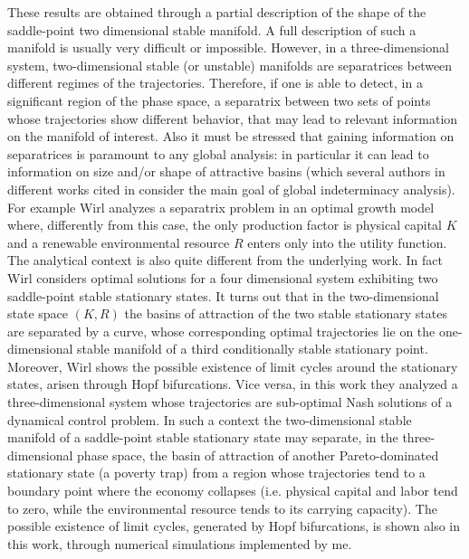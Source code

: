 These results are obtained through a partial description of the shape of the saddle-point two dimensional stable manifold. A full description of such a manifold is usually very difficult or impossible. However, in a three-dimensional system, two-dimensional stable (or unstable) manifolds are separatrices between different regimes of the trajectories. Therefore, if one is able to detect, in a significant region of the phase space, a separatrix between two sets of points whose trajectories show different behavior, that may lead to relevant information on the manifold of interest. Also it must be stressed that gaining information on separatrices is paramount to any global analysis: in particular it can lead to information on size and/or shape of attractive basins (which several authors in different works cited in \cite{antoci_poverty_2011} consider the main goal of global indeterminacy analysis).\\ 
For example Wirl \cite{wirl_sustainable_2004} analyzes a separatrix problem in an optimal growth model where, differently from this case, the only production factor is physical capital $K$ and a renewable environmental resource $R$ enters only into the utility function. The analytical context is also quite different from the underlying work. In fact Wirl considers optimal solutions for a four dimensional system exhibiting two saddle-point stable stationary states. It turns out that in the two-dimensional state space $(K,R)$ the basins of attraction of the two stable stationary states are separated by a curve, whose corresponding optimal trajectories lie on the one-dimensional stable manifold of a third conditionally stable stationary point. Moreover, Wirl shows the possible existence of limit cycles around the stationary states, arisen through Hopf bifurcations. Vice versa, in this work they analyzed a three-dimensional system whose trajectories are sub-optimal Nash solutions of a dynamical control problem. In such a context the two-dimensional stable manifold of a saddle-point stable stationary state may separate, in the three-dimensional phase space, the basin of attraction of another Pareto-dominated stationary state (a poverty trap) from a region whose trajectories tend to a boundary point where the economy collapses (i.e. physical capital and labor tend to zero, while the environmental resource tends to its carrying capacity). The possible existence of limit cycles, generated by Hopf bifurcations, is shown also in this work, through numerical simulations implemented by me.

